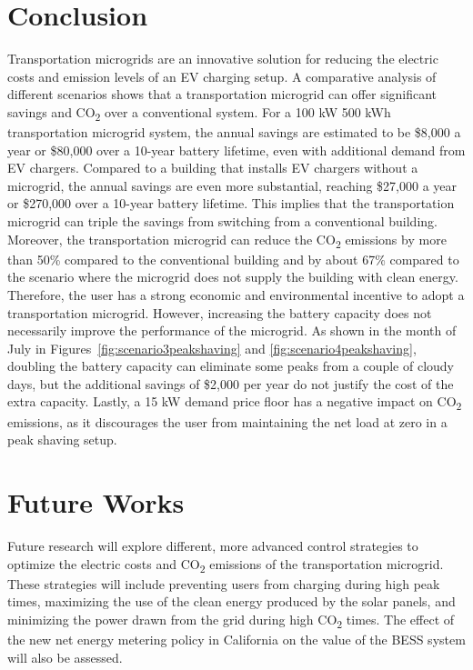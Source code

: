 \documentclass[conference]{IEEEtran}
\begin{document}
	\section{Conclusion}
		Transportation microgrids are an innovative solution for reducing the electric costs and emission levels of an EV charging setup. A comparative analysis of different scenarios shows that a transportation microgrid can offer significant savings and CO\textsubscript{2} over a conventional system. For a 100 kW 500 kWh transportation microgrid system, the annual savings are estimated to be \$8,000 a year or \$80,000 over a 10-year battery lifetime, even with additional demand from EV chargers. Compared to a building that installs EV chargers without a microgrid, the annual savings are even more substantial, reaching \$27,000 a year or \$270,000 over a 10-year battery lifetime. This implies that the transportation microgrid can triple the savings from switching from a conventional building. Moreover, the transportation microgrid can reduce the CO\textsubscript{2} emissions by more than 50\% compared to the conventional building and by about 67\% compared to the scenario where the microgrid does not supply the building with clean energy. Therefore, the user has a strong economic and environmental incentive to adopt a transportation microgrid. However, increasing the battery capacity does not necessarily improve the performance of the microgrid. As shown in the month of July in Figures \ref{fig:scenario3peakshaving} and \ref{fig:scenario4peakshaving}, doubling the battery capacity can eliminate some peaks from a couple of cloudy days, but the additional savings of \$2,000 per year do not justify the cost of the extra capacity. Lastly, a 15 kW demand price floor has a negative impact on CO\textsubscript{2} emissions, as it discourages the user from maintaining the net load at zero in a peak shaving setup.
	\section{Future Works}
		  Future research will explore different, more advanced control strategies to optimize the electric costs and CO\textsubscript{2} emissions of the transportation microgrid. These strategies will include preventing users from charging during high peak times, maximizing the use of the clean energy produced by the solar panels, and minimizing the power drawn from the grid during high CO\textsubscript{2} times. The effect of the new net energy metering policy in California on the value of the BESS system will also be assessed.
		
		
		
\end{document}
